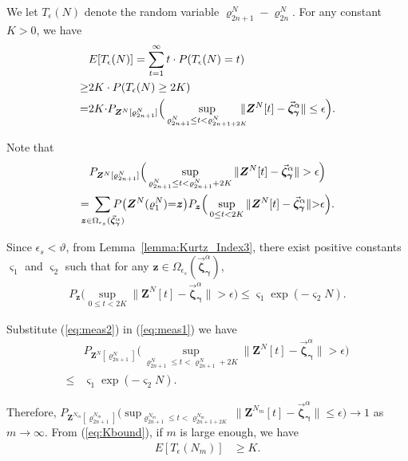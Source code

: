 \documentclass[11pt,twocolumn]{IEEEtran}
\begin{document}
We let $T_{\epsilon}(N)$ denote the random variable $\varrho^{N}_{2n+1}-\varrho^{N}_{2n}$. For any constant $K>0$, we have
\begin{align}
&E[T_{\epsilon}(N)]= \sum_{t=1}^{\infty} t \cdot P(T_{\epsilon}(N)=t) \nonumber \\
\geq& 2K \cdot P(T_{\epsilon}(N)\geq 2K)  \nonumber\\
=& 2K{\cdot}P_{\bm Z^N[\varrho^{N}_{2n+1}]}\Big(\sup_{\varrho^{N}_{2n+1} \leq t <\varrho^{N}_{2n+1+2K}}\hspace{-8pt}\| \bm Z^{N}[t]- \vec{\bm \zeta}^{\alpha}_{\bm
\gamma}\|\leq \epsilon  \Big). \label{eq:Kbound}
\end{align}

Note that
\begin{align}
&P_{\bm Z^N[\varrho^{N}_{2n+1}]}\Big(\sup_{\varrho^{N}_{2n+1} \leq t <\varrho^{N}_{2n+1}+2K} \| \bm Z^{N}[t]- \vec{\bm \zeta}^{\alpha}_{\bm
\gamma} \|> \epsilon  \Big) \nonumber \\
=& \hspace{-9pt}\sum_{\bm z \in \Omega_{\epsilon_s}(\vec{\bm \zeta}^{\alpha}_{\bm \gamma})} \hspace{-12pt}P\big(\bm Z^{N}(\varrho^{N}_1){=}\bm z\big) P_{\bm z}\Big(\sup_{0 \leq t < 2K} \| \bm Z^{N}[t]- \vec{\bm \zeta}^{\alpha}_{\bm
\gamma}\|{>}\epsilon\Big). \label{eq:meas1}
\end{align}

Since $\epsilon_s< \vartheta$, from Lemma~\ref{lemma:Kurtz_Index3}, there exist positive constants $\varsigma_1$ and $\varsigma_2$ such that for any $\bm z\in \Omega_{\epsilon_s}(\vec{\bm \zeta}^{\alpha}_{\bm \gamma})$,
\begin{align}
P_{\bm z}\Big(\sup_{0 \leq t < 2K} \| \bm Z^{N}[t]- \vec{\bm \zeta}^{\alpha}_{\bm
\gamma}\|> \epsilon  \Big) \leq \varsigma_1 \exp(-\varsigma_2 N). \label{eq:meas2}
\end{align}

Substitute (\ref{eq:meas2}) in (\ref{eq:meas1}) we have
\begin{align}
&P_{\bm Z^N[\varrho^{N}_{2n+1}]}\Big(\sup_{\varrho^{N}_{2n+1} \leq t <\varrho^{N}_{2n+1}+2K} \| \bm Z^{N}[t]- \vec{\bm \zeta}^{\alpha}_{\bm
\gamma} \|> \epsilon  \Big)\nonumber\\
\leq& \varsigma_1 \exp(-\varsigma_2 N). \nonumber
\end{align}

Therefore, $P_{\bm Z^{N_m}[\varrho^{N_m}_{2n+1}]}\Big(\sup_{\varrho^{N_m}_{2n+1} \leq t <\varrho^{N_m}_{2n+1+2K}} \| \bm Z^{N_m}[t]- \vec{\bm \zeta}^{\alpha}_{\bm
\gamma}\|\leq \epsilon  \Big)\rightarrow 1$ as $m \rightarrow \infty$. From (\ref{eq:Kbound}), if $m$ is large enough, we have
\begin{align}
E[T_{\epsilon}(N_m)]& \geq K. \nonumber
\end{align}
\end{document}
